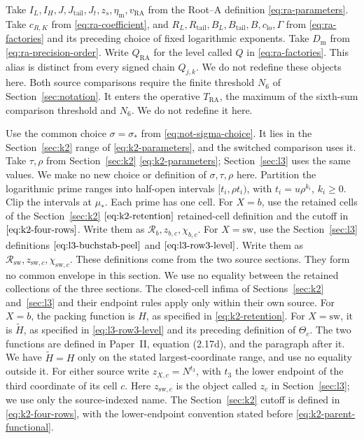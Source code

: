 Take \(I_L,I_H,J,J_{\mathrm{tail}},J_t,z_s,\eta_{\mathrm m},
v_{\mathrm{RA}}\) from the Root--A definition \eqref{eq:ra-parameters}.
Take \(c_{R,K}\) from \eqref{eq:ra-coefficient}, and
\(R_L,R_{\mathrm{tail}},B_L,B_{\mathrm{tail}},B,c_{\mathrm{lo}},\Gamma\)
from \eqref{eq:ra-factories} and its preceding choice of fixed logarithmic
exponents. Take \(D_{\mathrm m}\) from \eqref{eq:ra-precision-order}.
Write \(Q_{\mathrm{RA}}\) for the level called \(Q\) in
\eqref{eq:ra-factories}. This alias is distinct from every signed chain
\(Q_{j,k}\). We do not redefine these objects here.
Both source comparisons require the finite threshold \(N_6\)
of Section~\ref{sec:notation}.
It enters the operative \(T_{\mathrm{RA}}\), the maximum of the
sixth-sum comparison threshold and \(N_6\). We do not redefine it here.

Use the common choice \(\sigma=\sigma_*\) from
\eqref{eq:not-sigma-choice}. It lies in the Section~\ref{sec:k2} range of
\eqref{eq:k2-parameters}, and the switched comparison uses it. Take
\(\tau,\rho\) from Section~\ref{sec:k2} \eqref{eq:k2-parameters}; Section~\ref{sec:l3} uses the same
values. We make no new choice or definition of
\(\sigma,\tau,\rho\) here.
Partition the logarithmic prime ranges into half-open intervals
\([t_i,\rho t_i)\), with \(t_i=u\rho^{k_i}\), \(k_i\ge0\).
Clip the intervals at \(\mu_*\).
Each prime has one cell.
For \(X=b\), use the retained cells of the Section~\ref{sec:k2}
\(\eqref{eq:k2-retention}\) retained-cell definition and the cutoff in
\(\eqref{eq:k2-four-rows}\). Write them as
\(\mathcal R_b,z_{b,c},\chi_{b,c}\). For \(X=\mathrm{sw}\), use the
Section~\ref{sec:l3} definitions \(\eqref{eq:l3-buchstab-peel}\) and
\(\eqref{eq:l3-row3-level}\). Write them as
\(\mathcal R_{\mathrm{sw}},z_{\mathrm{sw},c},\chi_{\mathrm{sw},c}\).
These definitions come from the two source sections.
They form no common envelope in this section.
We use no equality between the retained collections of the three sections.
The closed-cell infima of Sections~\ref{sec:k2} and~\ref{sec:l3} and their endpoint rules
apply only within their own source.
For \(X=b\), the packing function is \(H\), as specified in
\eqref{eq:k2-retention}. For \(X=\mathrm{sw}\), it is
\(\widetilde H\), as specified in \eqref{eq:l3-row3-level} and its
preceding definition of \(\Theta_c\). The two functions are defined in
Paper~II, equation (2.17d), and the paragraph after it.
We have \(\widetilde H=H\) only on the stated largest-coordinate
range, and use no equality outside it.
For either source write \(z_{X,c}=N^{t_3}\), with \(t_3\) the lower
endpoint of the third coordinate of its cell \(c\). Here
\(z_{\mathrm{sw},c}\) is the object called \(z_c\) in Section~\ref{sec:l3}; we use only the
source-indexed name. The Section~\ref{sec:k2} cutoff is defined
in \eqref{eq:k2-four-rows}, with the lower-endpoint convention stated
before \eqref{eq:k2-parent-functional}.

